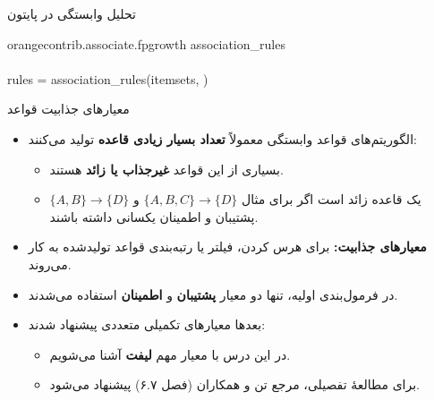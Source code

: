 \begin{frame}[fragile]{تحلیل وابستگی در پایتون}{}
\vspace{-0.1cm}
\begin{center}
\begin{minipage}{0.88\textwidth}
\begin{tcolorbox}[colback=codebg,colframe=codeborder,arc=3pt,left=6pt,right=6pt,top=4pt,bottom=4pt]
\begin{latin}
\fontsize{8.5}{11}\selectfont
\textbf{\color{blue!80!black}{from}} orangecontrib.associate.fpgrowth \textbf{\color{blue!80!black}{import}} association\_rules\\[3pt]
\textit{\color{gray}{\# Calculate association rules from itemsets (min confidence = 0.70)}}\\
rules = association\_rules(itemsets, \textbf{\color{red!80!black}{0.70}})
\end{latin}
\end{tcolorbox}
\end{minipage}
\end{center}
\end{frame}

\begin{frame}{معیارهای جذابیت قواعد}{}
\begin{itemize}\setlength{\itemsep}{6pt}
    \item الگوریتم‌های قواعد وابستگی معمولاً \textbf{تعداد بسیار زیادی قاعده} تولید می‌کنند:
    \begin{itemize}\setlength{\itemsep}{3pt}
        \item بسیاری از این قواعد \alert{\textbf{غیرجذاب یا زائد}}  هستند.
        \item یک قاعده زائد است اگر برای مثال $\{A,B,C\} \to \{D\}$ و $\{A,B\} \to \{D\}$ پشتیبان و اطمینان یکسانی داشته باشند.
    \end{itemize}
    \item \textbf{معیارهای جذابیت:} برای هرس کردن، فیلتر یا رتبه‌بندی قواعد تولیدشده به کار می‌روند.
    \item در فرمول‌بندی اولیه، تنها دو معیار \textbf{پشتیبان} و \textbf{اطمینان} استفاده می‌شدند.
    \item بعدها معیارهای تکمیلی متعددی پیشنهاد شدند:
    \begin{itemize}\setlength{\itemsep}{3pt}
        \item در این درس با معیار مهم \textbf{لیفت}  آشنا می‌شویم.
        \item برای مطالعهٔ تفصیلی، مرجع تن و همکاران (فصل ۶.۷) پیشنهاد می‌شود.
    \end{itemize}
\end{itemize}
\end{frame}

